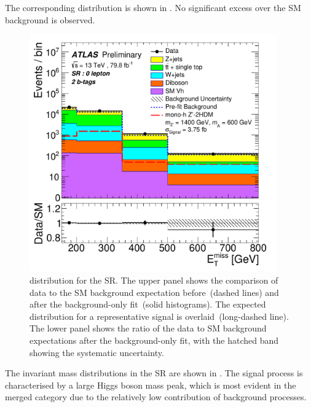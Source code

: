 The corresponding \met distribution is shown in . No significant excess over the SM background is observed.

\begin{figure}[htbp]
\centering
\includegraphics[width=0.95\textwidth]{figures/monoH/results/fig_07.pdf}
\caption{\met distribution for the SR. The upper panel shows the comparison of data to the SM background expectation before~(dashed lines) and after the background-only fit~(solid histograms). The expected distribution for a representative \zhdm signal is overlaid~(long-dashed line). The lower panel shows the ratio of the data to SM background expectations after the background-only fit, with the hatched band showing the systematic uncertainty.}
  \label{fig:monoH:results:observed:met}
\end{figure}

The invariant mass distributions in the SR are shown in . The signal process is characterised by a large Higgs boson mass peak, which is most evident in the merged category due to the relatively low contribution of background processes.

